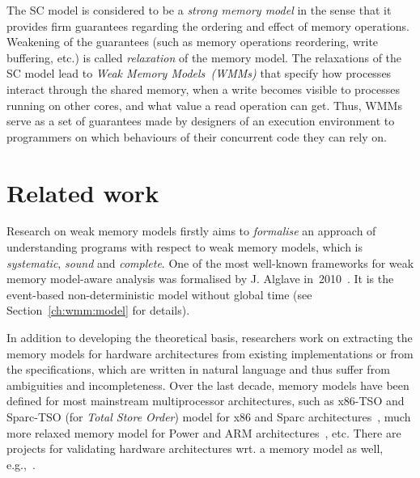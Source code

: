 The SC model is considered to be a \textit{strong memory model} in the sense that it provides firm guarantees regarding the ordering and effect of memory operations.
Weakening of the guarantees (such as memory operations reordering, write buffering, etc.) is called \textit{relaxation} of the memory model.
The relaxations of the SC model lead to \textit{Weak Memory Models~(WMMs)} that specify how processes interact through the shared memory, when a write becomes visible to processes running on other cores, and what value a read operation can get.
Thus, WMMs serve as a set of guarantees made by designers of an execution environment to programmers on which behaviours of their concurrent code they can rely on.


\section{Related work}
\label{ch:intro:related}

Research on weak memory models firstly aims to \textit{formalise} an approach of understanding programs with respect to weak memory models, which is \textit{systematic}, \textit{sound} and \textit{complete}.
One of the most well-known frameworks for weak memory model-aware analysis was formalised by J. Alglave in~2010~\cite{alglave2010shared}.
It is the event-based non-deterministic model without global time (see Section~\ref{ch:wmm:model} for details).

In addition to developing the theoretical basis, researchers work on extracting the memory models for hardware architectures from existing implementations or from the specifications, which are written in natural language and thus suffer from ambiguities and incompleteness.
Over the last decade, memory models have been defined for most mainstream multiprocessor architectures, such as x86-TSO and Sparc-TSO (for \textit{Total Store Order}) model for x86 and Sparc architectures~\cite{owens2009better}, much more relaxed memory model for Power and ARM architectures~\cite{alglave2009semantics,sarkar2011understanding, alglave2014herding}, etc. %
There are projects for validating hardware architectures wrt. a memory model as well, e.g.,~\cite{lustig2014pipecheck,lustig2016coatcheck}.



